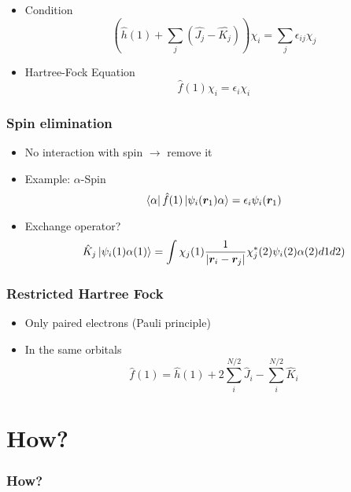 \documentclass{beamer}
\begin{document}
\begin{frame}
    \begin{itemize}
        \item Condition
        \begin{equation*}
            \left(\hat{h}(1) + \sum_j(\hat{J_j} - \hat{K_j})\right)\chi_i = \sum_{j}\epsilon_{ij}\chi_j
        \end{equation*}
        \item Hartree-Fock Equation
        \begin{equation*}
            \hat{f}(1)\chi_i = \epsilon_i\chi_i
        \end{equation*}
    \end{itemize}
\end{frame}

\begin{frame}
    \frametitle{Spin elimination}
    \begin{itemize}
        \item No interaction with spin $\rightarrow$ remove it
        \item Example: $\alpha$-Spin
        \begin{equation*}
            \bra{\alpha}\hat{f}(1)\ket{\psi_i(\boldsymbol{r}_1)\alpha} = \epsilon_i\psi_i(\boldsymbol{r}_1)
        \end{equation*}
        \item Exchange operator?
        \begin{equation*}
            \hat{K}_j\ket{\psi_i(1)\alpha(1)} = \int\chi_j(1)\frac{1}{|\boldsymbol{r}_i - \boldsymbol{r}_j|}\chi_j^*(2)\psi_i(2)\alpha(2)d1d2)
        \end{equation*}
    \end{itemize}
\end{frame}

\begin{frame}
    \frametitle{Restricted Hartree Fock}
    \begin{itemize}
        \item Only paired electrons (Pauli principle)
        \item In the same orbitals
        \begin{equation*}
            \hat{f}(1) = \hat{h}(1) + 2\sum_i^{N/2}\hat{J}_i - \sum_i^{N/2}\hat{K}_i
        \end{equation*}
    \end{itemize}
\end{frame}
\section{How?}
\label{sec:how}
\begin{frame}
    \frametitle{How?}
\end{frame}
\end{document}
